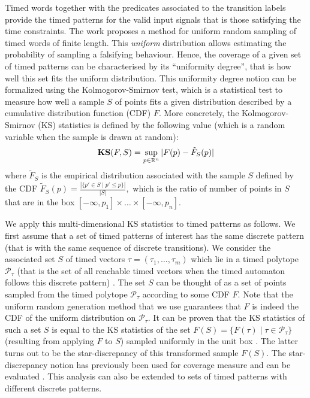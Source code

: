 Timed words together with the predicates associated to the transition labels provide the timed patterns for the valid input signals that is those satisfying the time constraints. The work \cite{BBBK16} proposes a method for uniform random sampling of timed words of finite length. This \emph{uniform} distribution allows estimating the probability of sampling a falsifying behaviour. Hence, the coverage of a given set of timed patterns can be characterised by its ``uniformity degree'', that is how well this set fits the uniform distribution. This uniformity degree notion can be formalized using the Kolmogorov-Smirnov test, which is a statistical test to measure how well a sample $S$ of points fits a given distribution described by a cumulative distribution function (CDF) $F$. More concretely, the Kolmogorov-Smirnov (KS) statistics is defined by the following value (which is a random variable when the sample is drawn at random):
$$\mathbf{KS}(F,S)=\sup_{p\in\mathbb{R}^n}|F(p)-\tilde F_S(p)|$$
where $\tilde F_S$ is the empirical distribution associated with the sample $S$ defined by the CDF 
$\tilde F_S(p)=\displaystyle{\frac{|\{p'\in S\mid  p'\leq p\}|}{|S|}},$ which is the ratio of number of points in $S$ that are in the box $[-\infty, p_1]\times \ldots\times [-\infty, p_n].$ 

We apply this multi-dimensional KS statistics to timed patterns as follows. We first assume that a set of timed patterns of interest has the same discrete pattern (that is with the same sequence of discrete transitions). We consider the associated set $S$ of timed vectors $\tau = (\tau_1, \ldots, \tau_m)$ which lie in a timed polytope $\mathcal{P}_{\tau}$ (that is the set of all reachable timed vectors when the timed automaton follows this discrete pattern) \cite{BBBK16}. The set $S$ can be thought of as a set of points sampled from the timed polytope $\mathcal{P}_{\tau}$ according to some CDF $F$. Note that the uniform random generation method  \cite{BBBK16}  that we use guarantees that $F$ is indeed the CDF of the uniform distribution on $\mathcal{P}_{\tau}$. It can be proven that the KS statistics of such a set $S$ is equal to the KS statistics of the set $F(S)=\{F(\tau)\mid  \tau \in \mathcal{P}_{\tau}\}$ (resulting from applying $F$ to $S$) sampled uniformly in the unit box \cite{rosenblatt1952}. The latter turns out to be the star-discrepancy of this transformed sample $F(S)$. The star-discrepancy notion has previously been used for coverage measure and can be evaluated \cite{DangN09}. This analysis can also be extended to sets of timed patterns with different discrete patterns.

